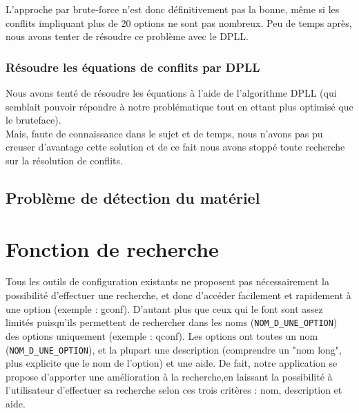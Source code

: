\documentclass[17pts]{report}
\begin{document}
L'approche par brute-force n'est donc définitivement pas la bonne, même si les
conflits impliquant plus de 20 options ne sont pas nombreux.
Peu de temps après, nous avons tenter de résoudre ce problème avec le DPLL.\\

\subsubsection{Résoudre les équations de conflits par DPLL}
\label{ssub:Résoudre les équations de conflits par DPLL}

Nous avons tenté de résoudre les équations à l'aide de l'algorithme DPLL (qui
semblait pouvoir répondre à notre problématique tout en ettant plus optimisé
que le bruteface).\\
Mais, faute de connaissance dans le sujet et de temps, nous n'avons pas pu
creuser d'avantage cette solution et de ce fait nous avons stoppé toute
recherche sur la résolution de conflits.\\

\subsection{Problème de détection du matériel}
\label{sub:Problème de détection du matériel}

\section{Fonction de recherche}
\label{sec:Fonction de recherche}

Tous les outils de configuration existants ne proposent pas nécessairement la 
possibilité d'effectuer une recherche, et donc d'accéder facilement et rapidement
à une option (exemple : gconf). D'autant plus que ceux qui le font sont assez 
limités puisqu'ils permettent de rechercher dans les noms 
(\verb|NOM_D_UNE_OPTION|) des options uniquement (exemple : qconf). Les options
 ont toutes un nom (\verb|NOM_D_UNE_OPTION|), et la plupart une description 
(comprendre un "nom long", plus explicite que le nom de l'option) et une aide.
De fait, notre application se propose d'apporter une amélioration à la 
recherche,en laissant la possibilité à l'utilisateur d'effectuer sa recherche 
selon ces trois critères : nom, description et aide.\\
\end{document}
